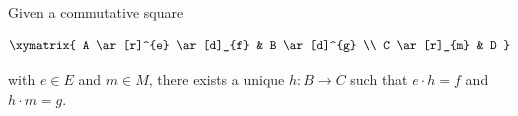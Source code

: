 Given a commutative square

$$\xymatrix{
A \ar[r]^{e} \ar[d]_{f} & B \ar[d]^{g} \\
C \ar[r]_{m} & D
}$$

with $e \in E$ and $m \in M$, there exists a unique $h: B \longrightarrow C$ such that $e \cdot h = f$ and $h \cdot m = g$.
